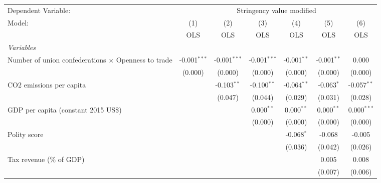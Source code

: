 
\begingroup
\centering
\begin{tabular}{lcccccc}
   \toprule
   Dependent Variable: & \multicolumn{6}{c}{Stringency value modified}\\
   Model:                                                     & (1)            & (2)            & (3)            & (4)           & (5)           & (6)\\  
                                                              &  OLS           & OLS            & OLS            & OLS           & OLS           & OLS\\  
   \midrule
   \emph{Variables}\\
   Number of union confederations $\times$ Openness to trade  & -0.001$^{***}$ & -0.001$^{***}$ & -0.001$^{***}$ & -0.001$^{**}$ & -0.001$^{**}$ & 0.000\\   
                                                              & (0.000)        & (0.000)        & (0.000)        & (0.000)       & (0.000)       & (0.000)\\   
   CO2 emissions per capita                                   &                & -0.103$^{**}$  & -0.100$^{**}$  & -0.064$^{**}$ & -0.063$^{*}$  & -0.057$^{**}$\\   
                                                              &                & (0.047)        & (0.044)        & (0.029)       & (0.031)       & (0.028)\\   
   GDP per capita (constant 2015 US\$)                        &                &                & 0.000$^{**}$   & 0.000$^{**}$  & 0.000$^{**}$  & 0.000$^{***}$\\   
                                                              &                &                & (0.000)        & (0.000)       & (0.000)       & (0.000)\\   
   Polity score                                               &                &                &                & -0.068$^{*}$  & -0.068        & -0.005\\   
                                                              &                &                &                & (0.036)       & (0.042)       & (0.026)\\   
   Tax revenue (\% of GDP)                                    &                &                &                &               & 0.005         & 0.008\\   
                                                              &                &                &                &               & (0.007)       & (0.006)\\   

\end{tabular}
